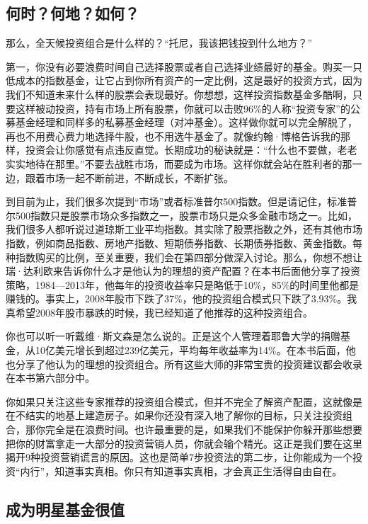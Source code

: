 \subsection{何时？何地？如何？}

那么，全天候投资组合是什么样的？“托尼，我该把钱投到什么地方？”

第一，你没有必要浪费时间自己选择股票或者自己选择业绩最好的基金。购买一只低成本的指数基金，让它占到你所有资产的一定比例，这是最好的投资方式，因为我们不知道未来什么样的股票会表现最好。你想想，这样投资指数基金多酷啊，只要这样被动投资，持有市场上所有股票，你就可以击败96\%的人称“投资专家”的公募基金经理和同样多的私募基金经理（对冲基金）。这样做你就可以完全解脱了，再也不用费心费力地选择牛股，也不用选牛基金了。就像约翰·博格告诉我的那样，投资会让你感觉有点违反直觉。长期成功的秘诀就是：“什么也不要做，老老实实地待在那里。”不要去战胜市场，而要成为市场。这样你就会站在胜利者的那一边，跟着市场一起不断前进，不断成长，不断扩张。

到目前为止，我们很多次提到“市场”或者标准普尔500指数。但是请记住，标准普尔500指数只是股票市场众多指数之一，股票市场只是众多金融市场之一。比如，我们很多人都听说过道琼斯工业平均指数。其实除了股票指数之外，还有其他市场指数，例如商品指数、房地产指数、短期债券指数、长期债券指数、黄金指数。每种指数购买的比例，至关重要，我们会在第四部分做深入讨论。那么，你想不想让瑞·达利欧来告诉你什么才是他认为的理想的资产配置？在本书后面他分享了投资策略，1984—2013年，他每年的投资收益率只是略低于10\%，85\%的时间里他都是赚钱的。事实上，2008年股市下跌了37\%，他的投资组合模式只下跌了3.93\%。我真希望2008年股市暴跌的时候，我已经知道了他推荐的这种投资组合。

你也可以听一听戴维·斯文森是怎么说的。正是这个人管理着耶鲁大学的捐赠基金，从10亿美元增长到超过239亿美元，平均每年收益率为14\%。在本书后面，他也分享了他认为的理想的投资组合。所有这些大师的非常宝贵的投资建议都会收录在本书第六部分中。

你如果只关注这些专家推荐的投资组合模式，但并不完全了解资产配置，这就像是在不结实的地基上建造房子。如果你还没有深入地了解你的目标，只关注投资组合，那你完全是在浪费时间。也许最重要的是，如果我们不能保护你躲开那些想要把你的财富拿走一大部分的投资营销人员，你就会输个精光。这正是我们要在这里揭开9种投资营销谎言的原因。这也是简单7步投资法的第二步，让你能成为一个投资“内行”，知道事实真相。你只有知道事实真相，才会真正生活得自由自在。

\subsection{成为明星基金很值}

